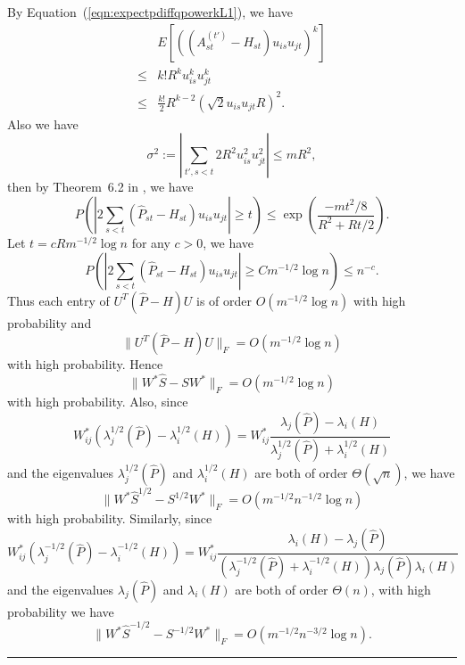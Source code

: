 \documentclass[a4paper]{article}
\newenvironment{proof}{{\bf Proof:  }}{\hfill\rule{2mm}{2mm}}
\renewcommand{\hat}{\widehat}
\begin{document}
\begin{proof}
By Equation~(\ref{eqn:expectpdiffqpowerkL1}), we have
\begin{align*}
	& E\left[\left((A^{(t')}_{st} - H_{st}) u_{is} u_{jt}\right)^k\right] \\
    \le & k! R^k u_{is}^k u_{jt}^k \\
    \le & \frac{k!}{2} R^{k-2} (\sqrt{2} u_{is} u_{jt} R)^2.
\end{align*}
Also we have
\[
	\sigma^2 := \left|\sum_{t', s<t} 2 R^2 u_{is}^2 u_{jt}^2\right| \le m R^2,
\]
then by Theorem~6.2 in \citep{tropp2012user}, we have
\[
	P \left( \left| 2 \sum_{s<t} (\hat{P}_{st} - H_{st}) u_{is} u_{jt} \right| \ge t \right)
    \le \exp \left( \frac{-m t^2/8}{R^2 + R t /2} \right).
\]
Let $t = c R m^{-1/2} \log n$ for any $c > 0$, we have
\[
P \left( \left| 2 \sum_{s<t} (\hat{P}_{st} - H_{st}) u_{is} u_{jt} \right| \ge C m^{-1/2} \log n \right)
    \le n^{-c}.
\]
Thus each entry of $U^T(\hat{P} - H)U$ is of order $O(m^{-1/2} \log n)$ with high probability and
\begin{equation}
\label{eqn:uPhatdiffHuL1}
	\|U^T(\hat{P} - H)U\|_F = O(m^{-1/2} \log n)
\end{equation}
with high probability.
Hence
\[
	\| W^* \hat{S} - S W^* \|_F = O(m^{-1/2} \log n)
\]
with high probability.
Also, since
\[
	W_{ij}^* (\lambda_j^{1/2}(\hat{P}) - \lambda_i^{1/2}(H)) = W_{ij}^* \frac{\lambda_j(\hat{P}) - \lambda_i(H)}{\lambda_j^{1/2}(\hat{P}) + \lambda_i^{1/2}(H)}
\]
and the eigenvalues $\lambda_j^{1/2}(\hat{P})$ and $\lambda_i^{1/2}(H)$ are both of order $\Theta(\sqrt{n})$, we have
\[
	\| W^* \hat{S}^{1/2} - S^{1/2} W^* \|_F = O(m^{-1/2} n^{-1/2} \log n)
\]
with high probability.
Similarly, since
\[
	W_{ij}^* (\lambda_j^{-1/2}(\hat{P}) - \lambda_i^{-1/2}(H)) = W_{ij}^* \frac{\lambda_i(H) - \lambda_j(\hat{P})}{(\lambda_j^{-1/2}(\hat{P}) + \lambda_i^{-1/2}(H))\lambda_j(\hat{P}) \lambda_i(H)}
\]
and the eigenvalues $\lambda_j(\hat{P})$ and $\lambda_i(H)$ are both of order $\Theta(n)$, with high probability we have
\[
	\| W^* \hat{S}^{-1/2} - S^{-1/2} W^* \|_F = O(m^{-1/2} n^{-3/2} \log n).
\]
\end{proof}
\end{document}
